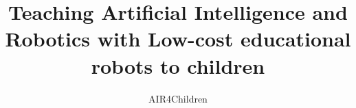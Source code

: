 \documentclass[sigconf]{acmart}
\begin{document}
\title{Teaching Artificial Intelligence and Robotics with Low-cost educational robots to children}


\author{AIR4Children}
\authornotemark[1]











\renewcommand{\shortauthors}{AIR4Children}
\end{document}

